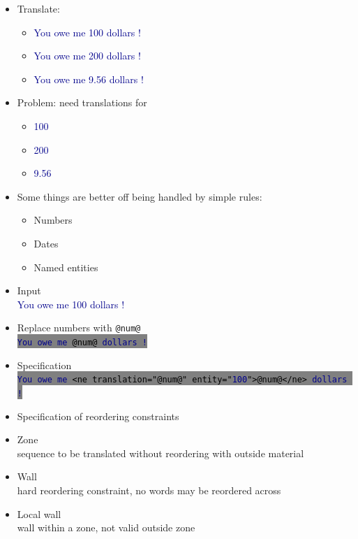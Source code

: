 \documentclass[landscape]{uedslides2C}
\newcommand{\example}[1]{\textcolor{darkblue}{\rm #1}}
\newcommand{\littlecode}[1]{\colorbox{gray}{\textcolor{black}{\small \tt #1}}}
\begin{document}
\begin{itemize} \itemsep -2mm
\item Translate:
\begin{itemize} \vspace{-2mm}
  \item \example{You owe me 100 dollars !}
  \item \example{You owe me 200 dollars !}
  \item \example{You owe me 9.56 dollars !}
\end{itemize}
\item Problem: need translations for
\begin{itemize} \vspace{-2mm}
  \item \example{100}
  \item \example{200}
  \item \example{9.56}
\end{itemize}
\item Some things are better off being handled by simple rules:
\begin{itemize} \vspace{-2mm}
  \item Numbers
  \item Dates
  \item Named entities
\end{itemize}
\end{itemize}


\vspace{2cm}
\begin{itemize}
\item Input \\
\example{You owe me 100 dollars !}
\item Replace numbers with {\tt @num@}\\[4mm]
 \littlecode{\example{You owe me} @num@ \example{dollars !}}
\item Specification\\[4mm]
 \littlecode{\example{You owe me}  <ne translation="@num@" entity="\example{100}">@num@</ne> \example{dollars !}}
\end{itemize}



\vspace{10mm}
\begin{itemize}
\item Specification of reordering constraints
\item Zone\\[2mm] sequence to be translated without reordering with outside material
\item Wall\\[2mm] hard reordering constraint, no words may be reordered across
\item Local wall\\[2mm] wall within a zone, not valid outside zone
\end{itemize}
\end{document}
